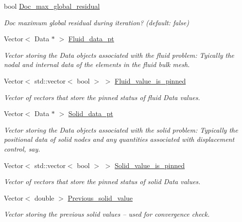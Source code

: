 \begin{DoxyCompactItemize}
bool \hyperlink{classoomph_1_1SegregatableFSIProblem_aadc0d46511ee90dad36d0d00a8c2d7ad}{Doc\+\_\+max\+\_\+global\+\_\+residual}
\begin{DoxyCompactList}\small\item\em Doc maximum global residual during iteration? (default\+: false) \end{DoxyCompactList}\item 
Vector$<$ Data $\ast$ $>$ \hyperlink{classoomph_1_1SegregatableFSIProblem_a1aac015f9f0e9c1b925a534278dc1e55}{Fluid\+\_\+data\+\_\+pt}
\begin{DoxyCompactList}\small\item\em Vector storing the Data objects associated with the fluid problem\+: Tyically the nodal and internal data of the elements in the fluid bulk mesh. \end{DoxyCompactList}\item 
Vector$<$ std\+::vector$<$ bool $>$ $>$ \hyperlink{classoomph_1_1SegregatableFSIProblem_aa39b7f8499588b28b9b490771c4bcff2}{Fluid\+\_\+value\+\_\+is\+\_\+pinned}
\begin{DoxyCompactList}\small\item\em Vector of vectors that store the pinned status of fluid Data values. \end{DoxyCompactList}\item 
Vector$<$ Data $\ast$ $>$ \hyperlink{classoomph_1_1SegregatableFSIProblem_aca9ab5f800334761ae470453ef476067}{Solid\+\_\+data\+\_\+pt}
\begin{DoxyCompactList}\small\item\em Vector storing the Data objects associated with the solid problem\+: Typically the positional data of solid nodes and any quantities associated with displacement control, say. \end{DoxyCompactList}\item 
Vector$<$ std\+::vector$<$ bool $>$ $>$ \hyperlink{classoomph_1_1SegregatableFSIProblem_a0f5d6ec62fd33f83600b69c9fcb1f4ed}{Solid\+\_\+value\+\_\+is\+\_\+pinned}
\begin{DoxyCompactList}\small\item\em Vector of vectors that store the pinned status of solid Data values. \end{DoxyCompactList}\item 
Vector$<$ double $>$ \hyperlink{classoomph_1_1SegregatableFSIProblem_a6e056ff378e38504d5e9d522820ca8cf}{Previous\+\_\+solid\+\_\+value}
\begin{DoxyCompactList}\small\item\em Vector storing the previous solid values -- used for convergence check. \end{DoxyCompactList}\item 

\end{DoxyCompactItemize}
